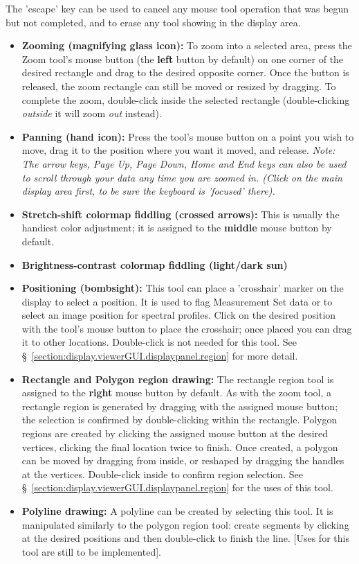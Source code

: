 The 'escape' key can be used to cancel any mouse tool operation that was
begun but not completed, and to erase any tool showing in the display area.
\begin{itemize}
   \item {\bf Zooming (magnifying glass icon):}
     To zoom into a selected area, press the Zoom tool's mouse button
     (the {\bf left} button by default) on one corner of the desired
     rectangle and drag to the desired opposite corner. Once the button is
     released, the zoom rectangle can still be moved or resized by dragging.
     To complete the zoom, double-click inside the selected rectangle
     (double-clicking {\it outside} it will zoom {\it out} instead).
   \item {\bf Panning (hand icon):} Press the tool's mouse button on a 
     point you wish to move, drag it to the position where you want it
     moved, and release. {\it Note: The arrow keys, Page Up, Page Down,
     Home and End keys can also be used to scroll through your data any time
     you are zoomed in. (Click on the main display area first, to be sure
     the keyboard is 'focused' there).}
   \item {\bf Stretch-shift colormap fiddling (crossed arrows):} This is
     usually the handiest color adjustment; it is assigned to the {\bf middle}
     mouse button by default.
   \item {\bf Brightness-contrast colormap fiddling (light/dark sun)} 
   \item {\bf Positioning (bombsight):} This tool can place a 'crosshair'
     marker on the display to select a position. It is used to flag
     Measurement Set data or to select an image position for spectral profiles.
     Click on the desired position with the tool's mouse button to place
     the crosshair; once placed you can drag it to other locations.
     Double-click is not needed for this tool.  
     See \S~\ref{section:display.viewerGUI.displaypanel.region} for more
     detail.
   \item {\bf Rectangle and Polygon region drawing:} The rectangle region tool
     is assigned to the {\bf right} mouse button by default. As with the zoom
     tool, a rectangle region is generated by dragging with the assigned mouse
     button; the selection is confirmed by double-clicking within the rectangle.
     Polygon regions are created by clicking the assigned mouse button
     at the desired vertices, clicking the final location twice to finish.
     Once created, a polygon can be moved by dragging from inside, or
     reshaped by dragging the handles at the vertices.  Double-click inside to
     confirm region selection.
     See \S~\ref{section:display.viewerGUI.displaypanel.region} for the uses
     of this tool.
   \item {\bf Polyline drawing:}
     A polyline can be created by selecting this tool. It is manipulated
     similarly to the polygon region tool: create segments by clicking at
     the desired positions and then double-click to finish the line.
     [Uses for this tool are still to be implemented].
\end{itemize}

